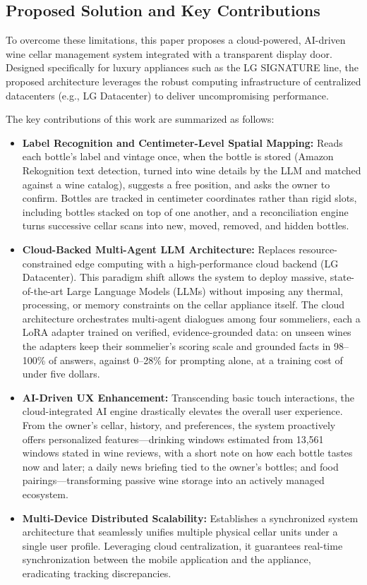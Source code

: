 \documentclass[conference]{IEEEtran}
\begin{document}
\subsection{Proposed Solution and Key Contributions}
To overcome these limitations, this paper proposes a cloud-powered, AI-driven wine cellar management system integrated with a transparent display door. Designed specifically for luxury appliances such as the LG SIGNATURE line, the proposed architecture leverages the robust computing infrastructure of centralized datacenters (e.g., LG Datacenter) to deliver uncompromising performance.

The key contributions of this work are summarized as follows:
\begin{itemize}
    \item \textbf{Label Recognition and Centimeter-Level Spatial Mapping:} Reads each bottle's label and vintage once, when the bottle is stored (Amazon Rekognition text detection, turned into wine details by the LLM and matched against a wine catalog), suggests a free position, and asks the owner to confirm. Bottles are tracked in centimeter coordinates rather than rigid slots, including bottles stacked on top of one another, and a reconciliation engine turns successive cellar scans into new, moved, removed, and hidden bottles.
    \item \textbf{Cloud-Backed Multi-Agent LLM Architecture:} Replaces resource-constrained edge computing with a high-performance cloud backend (LG Datacenter). This paradigm shift allows the system to deploy massive, state-of-the-art Large Language Models (LLMs) without imposing any thermal, processing, or memory constraints on the cellar appliance itself. The cloud architecture orchestrates multi-agent dialogues among four sommeliers, each a LoRA adapter trained on verified, evidence-grounded data: on unseen wines the adapters keep their sommelier's scoring scale and grounded facts in 98--100\% of answers, against 0--28\% for prompting alone, at a training cost of under five dollars.
    \item \textbf{AI-Driven UX Enhancement:} Transcending basic touch interactions, the cloud-integrated AI engine drastically elevates the overall user experience. From the owner's cellar, history, and preferences, the system proactively offers personalized features---drinking windows estimated from 13,561 windows stated in wine reviews, with a short note on how each bottle tastes now and later; a daily news briefing tied to the owner's bottles; and food pairings---transforming passive wine storage into an actively managed ecosystem.
    \item \textbf{Multi-Device Distributed Scalability:} Establishes a synchronized system architecture that seamlessly unifies multiple physical cellar units under a single user profile. Leveraging cloud centralization, it guarantees real-time synchronization between the mobile application and the appliance, eradicating tracking discrepancies.
\end{itemize}
\end{document}
